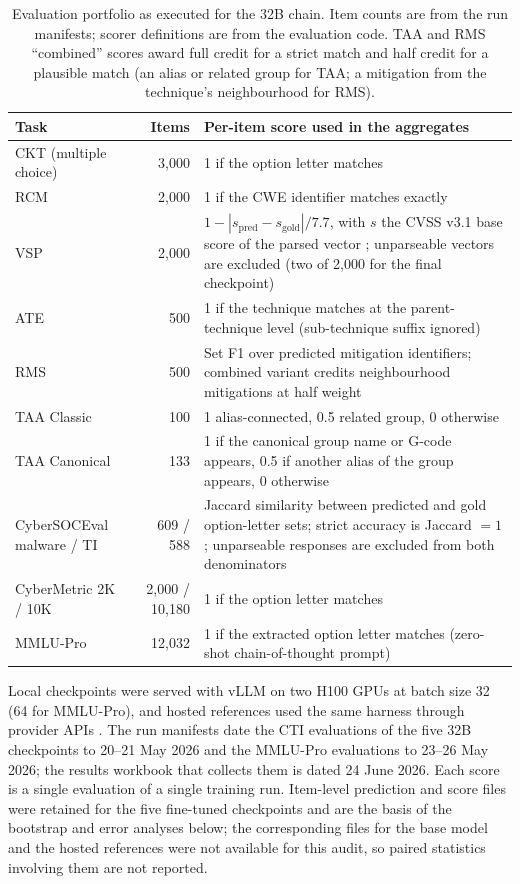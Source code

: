 \documentclass[preprint,12pt,authoryear]{elsarticle}
\begin{document}
\begin{table}[!htbp]
\centering\footnotesize
\caption{Evaluation portfolio as executed for the 32B chain. Item counts are from the run manifests; scorer definitions are from the evaluation code. TAA and RMS ``combined'' scores award full credit for a strict match and half credit for a plausible match (an alias or related group for TAA; a mitigation from the technique's neighbourhood for RMS).}\label{tab:portfolio}
\begin{tabularx}{\textwidth}{@{}lrX@{}}
\toprule Task & Items & Per-item score used in the aggregates \\\midrule
CKT (multiple choice) & 3,000 & 1 if the option letter matches \\
RCM & 2,000 & 1 if the CWE identifier matches exactly \\
VSP & 2,000 & $1-|s_{\text{pred}}-s_{\text{gold}}|/7.7$, with $s$ the CVSS v3.1 base score of the parsed vector \citep{first2019cvss}; unparseable vectors are excluded (two of 2,000 for the final checkpoint) \\
ATE & 500 & 1 if the technique matches at the parent-technique level (sub-technique suffix ignored) \\
RMS & 500 & Set F1 over predicted mitigation identifiers; combined variant credits neighbourhood mitigations at half weight \\
TAA Classic & 100 & 1 alias-connected, 0.5 related group, 0 otherwise \\
TAA Canonical & 133 & 1 if the canonical group name or G-code appears, 0.5 if another alias of the group appears, 0 otherwise \\
CyberSOCEval malware / TI & 609 / 588 & Jaccard similarity between predicted and gold option-letter sets; strict accuracy is Jaccard $=1$; unparseable responses are excluded from both denominators \\
CyberMetric 2K / 10K & 2,000 / 10,180 & 1 if the option letter matches \\
MMLU-Pro & 12,032 & 1 if the extracted option letter matches (zero-shot chain-of-thought prompt) \\\bottomrule
\end{tabularx}
\end{table}

Local checkpoints were served with vLLM \citep{kwon2023vllm} on two H100 GPUs at batch size 32 (64 for MMLU-Pro), and hosted references used the same harness through provider APIs \citep{glaukopis2026software}. The run manifests date the CTI evaluations of the five 32B checkpoints to 20--21 May 2026 and the MMLU-Pro evaluations to 23--26 May 2026; the results workbook that collects them is dated 24 June 2026. Each score is a single evaluation of a single training run. Item-level prediction and score files were retained for the five fine-tuned checkpoints and are the basis of the bootstrap and error analyses below; the corresponding files for the base model and the hosted references were not available for this audit, so paired statistics involving them are not reported.
\end{document}
